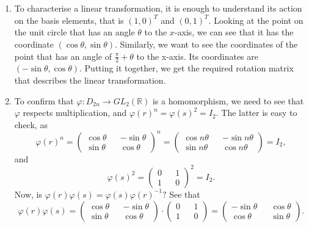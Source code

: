 \documentclass{article}
\begin{document}
\section{} %
\begin{enumerate}
	\item To characterise a linear transformation, it is enough to understand its action on the basis elements, that is $(1,0)^T$ and $(0,1)^T.$ Looking at 
	the point on the unit circle that has an angle $\theta$ to the $x$-axis, we can see that it has the coordinate $(\cos \theta, \sin \theta).$ Similarly, 
	we 
	want to see the coordinates of the point that has an angle of $\frac{\pi}{2}+ \theta$ to the x-axis. Its coordinates are $(-\sin \theta, \cos \theta).$ 
	Putting it together, we get the required rotation matrix that describes the linear transformation.
	\item To confirm that $\varphi:D_{2n} \rightarrow GL_2(\mathbb{R})$ is a homomorphism, we need to see that $\varphi$ respects multiplication, and  
	$\varphi(r)^n=\varphi(s)^2=I_{2}.$ The latter is easy to check, as $$\varphi(r)^n= \begin{pmatrix}
		\cos \theta && -\sin \theta \\
		\sin \theta && \cos \theta
	\end{pmatrix}^n=\begin{pmatrix}
	\cos n\theta && -\sin n\theta \\
	\sin n\theta && \cos n\theta
\end{pmatrix}=I_2,$$
and $$\varphi(s)^2= \begin{pmatrix}
	0 && 1 \\
	1 && 0
\end{pmatrix}^2=I_2.$$
Now, is $\varphi(r)\varphi(s)=\varphi(s)\varphi(r)^{-1}?$ See that $$\varphi(r)\varphi(s)= \begin{pmatrix}
	\cos \theta && -\sin \theta \\
	\sin \theta && \cos \theta
\end{pmatrix}\cdot \begin{pmatrix}
0 && 1\\
1 && 0
\end{pmatrix}= \begin{pmatrix}
-\sin \theta && \cos \theta \\
\cos \theta && \sin \theta
\end{pmatrix}.$$


\end{enumerate}
\end{document}
